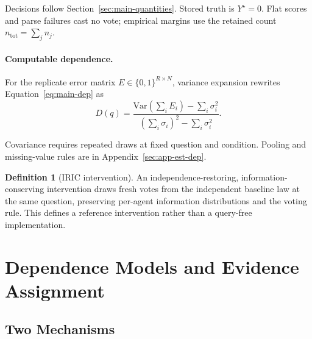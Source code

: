 \documentclass[11pt,a4paper]{article}
\theoremstyle{definition}
\newtheorem{definition}[theorem]{Definition}
\newcommand{\Dep}{D}
\newcommand{\Truth}{Y^{\star}}
\begin{document}
Decisions follow Section~\ref{sec:main-quantities}. Stored truth is $\Truth=0$.
Flat scores and parse failures cast no vote; empirical margins use the retained
count $n_{\mathrm{tot}}=\sum_j n_j$.

\paragraph{Computable dependence.}
For the replicate error matrix $E\in\{0,1\}^{R\times N}$, variance
expansion rewrites Equation~\ref{eq:main-dep} as
\begin{equation}
\Dep(q)=\frac{\mathrm{Var}(\sum_i E_i)-\sum_i\sigma_i^2}
{(\sum_i\sigma_i)^2-\sum_i\sigma_i^2}.
\label{eq:D}
\end{equation}

Covariance requires repeated draws at fixed question and condition. Pooling
and missing-value rules are in Appendix~\ref{sec:app-est-dep}.

\begin{definition}[IRIC intervention]
\label{def:iric}
An independence-restoring, information-conserving intervention draws fresh
votes from the independent baseline law at the same question, preserving
per-agent information distributions and the voting rule. This defines a
reference intervention rather than a query-free implementation.
\end{definition}

\section{Dependence Models and Evidence Assignment}
\label{sec:methodology}

\subsection{Two Mechanisms}
\label{sec:dependence-mechanisms}
\end{document}
